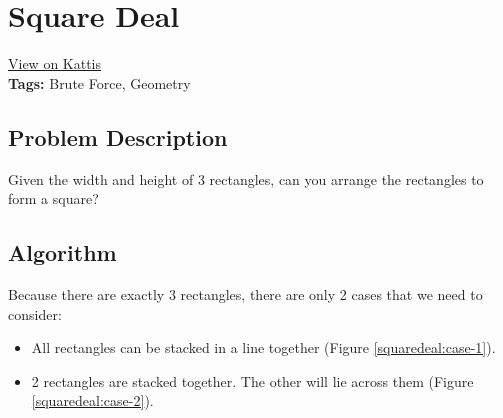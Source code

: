 \section{Square Deal}
\label{squaredeal}
\href{https://open.kattis.com/problems/squaredeal}{View on Kattis}\\
\textbf{Tags:} Brute Force, Geometry\\
\subsection{Problem Description}
Given the width and height of 3 rectangles, can you arrange the rectangles to
form a square?
\subsection{Algorithm}
Because there are exactly 3 rectangles, there are only 2 cases that we need to
consider:
\begin{itemize}
  \item All rectangles can be stacked in a line together (Figure
    \ref{squaredeal:case-1}).
  \item 2 rectangles are stacked together. The other will lie across them
  (Figure \ref{squaredeal:case-2}).
\end{itemize}

